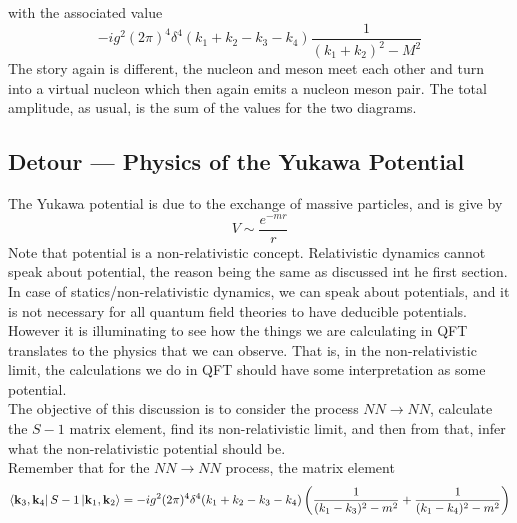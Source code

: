 \documentclass[11pt]{article}
\numberwithin{equation}{section}
\begin{document}
    with the associated value 
    \begin{equation*}
        -ig^2 (2\pi)^4\delta^4(k_1 + k_2 - k_3 - k_4) \frac{1}{(k_1+k_2)^2 - M^2}
    \end{equation*}
    The story again is different, the nucleon and meson meet each other and turn into a virtual nucleon which then again emits a nucleon meson pair. The total amplitude, as usual, is the sum of the values for the two diagrams.

    \subsection{Detour — Physics of the Yukawa Potential}
    The Yukawa potential is due to the exchange of massive particles, and is give by 
    \begin{equation*}
        V\sim \frac{e^{-mr}}{r}
    \end{equation*}
    Note that potential is a non-relativistic concept. Relativistic dynamics cannot speak about potential, the reason being the same as discussed int he first section. In case of statics/non-relativistic dynamics, we can speak about potentials, and it is not necessary for all quantum field theories to have deducible potentials. However it is illuminating to see how the things we are calculating in QFT translates to the physics that we can observe. That is, in the non-relativistic limit, the calculations we do in QFT should have some interpretation as some potential.\\

    The objective of this discussion is to consider the process \(NN\to NN\), calculate the \(S-1\) matrix element, find its non-relativistic limit, and then from that, infer what the non-relativistic potential should be. \\
    Remember that for the \(NN\to NN\) process, the matrix element 
    \begin{equation*}
        \bra{\textbf{k}_3, \textbf{k}_4} S-1 \ket{\textbf{k}_1, \textbf{k}_2} = -ig^2 (2\pi)^4\delta^4(k_1 +k_2 - k_3 - k_4) \left( \frac{1}{(k_1 - k_3)^2 - m^2} + \frac{1}{(k_1 - k_4)^2 - m^2 } \right)
    \end{equation*}
\end{document}

